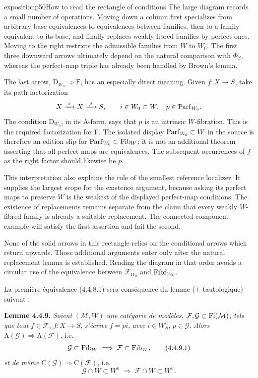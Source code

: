 \begin{dcomment}{exposition}{p50}{How to read the rectangle of conditions}
The large diagram records a small number of operations. Moving down a column first specializes from arbitrary base equivalences to equivalences between families, then to a family equivalent to its base, and finally replaces weakly fibred families by perfect ones. Moving to the right restricts the admissible families from $W$ to $W_0$. The first three downward arrows ultimately depend on the natural comparison with $\Phi_S$, whereas the perfect-map triple has already been handled by Brown's lemma.

The last arrow, $\mathrm D_{W_0}\Rightarrow\mathrm F$, has an especially direct meaning. Given $f:X\to S$, take its path factorization
\[
 X\xrightarrow{\ i\ }\bar X\xrightarrow{\ p\ }S,
 \qquad i\in W_0\subset W,\quad p\in\Parf_{W_0}.
\]
The condition $\mathrm D_{W_0}$, in its A-form, says that $p$ is an intrinsic $W$-fibration. This is the required factorization for F. The isolated display $\mathrm{Parf}_{W_0}\subset W$ in the source is therefore an edition slip for $\mathrm{Parf}_{W_0}\subset\mathrm{Fib}_W$; it is not an additional theorem asserting that all perfect maps are equivalences. The subsequent occurrences of $f$ as the right factor should likewise be $p$.

This interpretation also explains the role of the smallest reference localizer. It supplies the largest scope for the existence argument, because asking its perfect maps to preserve $W$ is the weakest of the displayed perfect-map conditions. The existence of replacements remains separate from the claim that every weakly $W$-fibred family is already a suitable replacement. The connected-component example will satisfy the first assertion and fail the second.

None of the solid arrows in this rectangle relies on the conditional arrows which return upwards. Those additional arguments enter only after the natural replacement lemma is established. Reading the diagram in that order avoids a circular use of the equivalence between $\mathcal F_{W_0}$ and $\mathrm{Fibf}_{W_0}$.
\end{dcomment}


La première équivalence (4.4.8.1) sera conséquence du lemme ($\pm$ tautologique) suivant :

\textbf{Lemme 4.4.9.} \textit{Soient} $(\mathcal{M}, W)$ \textit{une catégorie de modèles,} $\mathcal{F}, \mathcal{G} \subset \operatorname{Fl}(\mathcal{M})$, \textit{tels que tout} $f \in \mathcal{F}$, $f : X \longrightarrow S$, \textit{s'écrive} $f = pi$, \textit{avec} $i \in W^u_S$, $p \in \mathcal{G}$. \textit{Alors} $\mathrm{A}(\mathcal{G}) \Longrightarrow \mathrm{A}(\mathcal{F})$, i.e.
\[
\mathcal{G} \subset \Fib_W \;\Longrightarrow\; \mathcal{F} \subset \Fib_W,
\tag*{(4.4.9.1)}
\]
\textit{et de même} $\mathrm{C}(\mathcal{G}) \Longrightarrow \mathrm{C}(\mathcal{F})$, i.e.
\[
\mathcal{G} \cap W \subset W^u \;\Longrightarrow\; \mathcal{F} \cap W \subset W^u.
\tag*{(4.4.9.2)}
\]

